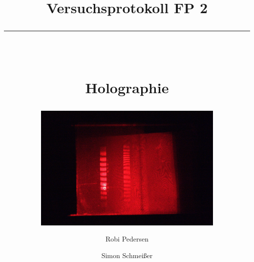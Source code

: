 \documentclass[a4paper,oneside,bibtotocnumbered]{scrartcl} %
\title{Versuchsprotokoll FP 2\\
\rule{0.5\textwidth}{0.4pt}\\
\vspace*{1cm}
\begin{Huge}
Holographie 
\end{Huge}
}
\subtitle{\vspace*{1cm}
\includegraphics[width=0.7\textwidth]{Photos/IMG_3909.jpg}
\vspace*{1.5cm}}
\author{Robi Pedersen \and Simon Schmeißer}
\date{Versuchsdurchführung 07.04. - 11.04.2011
\vspace*{1cm}\\
\rule{0.8\textwidth}{0.4pt}\\
Physikalisches Institut, Albert-Ludwigs-Universität Freiburg
}
\begin{document}
\begin{titlepage}
  \maketitle
  \vfill
  \thispagestyle{empty}
\end{titlepage}

\tableofcontents
\clearpage







%
%



\clearpage

 

\end{document}
